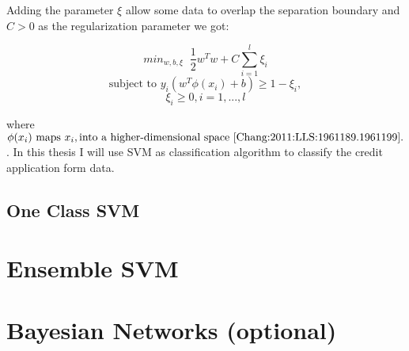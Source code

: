 Adding the parameter \(\xi\) allow some data to overlap the separation boundary and \(C > 0\) as the regularization parameter we got:

\[ min_{w,b,\xi} \;\; \frac{1}{2}w^Tw+C \sum_{i=1}^{l} \xi_i\]
\[ \textrm{subject to } y_i(w^T\phi(x_i) + b) \geq 1 - \xi_i, \]
\[\xi_i \geq 0, i = 1,...,l \]

where \( \phi(x_i) \textrm{ maps } x_i, \textrm{into a higher-dimensional space \cite{Chang:2011:LLS:1961189.1961199}.} \). In this thesis I will use SVM as classification algorithm to classify the credit application form data.

\subsection{One Class SVM}








\section{Ensemble SVM}

\section{Bayesian Networks (optional)}



